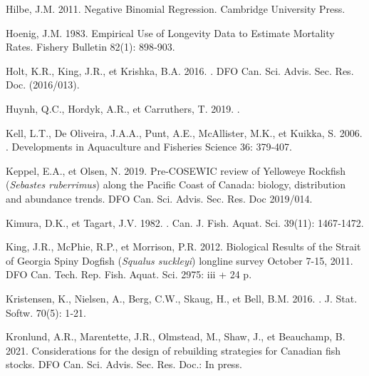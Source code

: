 \documentclass[french,11pt]{book}
\begin{document}
\begin{CSLReferences}{1}{0}
%
Hilbe, J.M. 2011. Negative {Binomial Regression}. {Cambridge University Press}.

%
Hoenig, J.M. 1983. Empirical Use of Longevity Data to Estimate Mortality Rates. Fishery Bulletin 82(1): 898‑903.

%
Holt, K.R., King, J.R., et Krishka, B.A. 2016. . DFO Can. Sci. Advis. Sec. Res. Doc. (2016/013).

%
Huynh, Q.C., Hordyk, A.R., et Carruthers, T. 2019. .

%
Kell, L.T., De Oliveira, J.A.A., Punt, A.E., McAllister, M.K., et Kuikka, S. 2006. . Developments in Aquaculture and Fisheries Science 36: 379‑407.

%
Keppel, E.A., et Olsen, N. 2019. {Pre-COSEWIC} review of {Yelloweye Rockfish} ({\emph{Sebastes ruberrimus}}) along the {Pacific} Coast of {Canada}: biology, distribution and abundance trends. DFO Can. Sci. Advis. Sec. Res. Doc 2019/014.

%
Kimura, D.K., et Tagart, J.V. 1982. . Can. J. Fish. Aquat. Sci. 39(11): 1467‑1472.

%
King, J.R., McPhie, R.P., et Morrison, P.R. 2012. Biological Results of the {Strait} of {Georgia Spiny Dogfish} ({\emph{Squalus suckleyi}}) longline survey {October} 7-15, 2011. DFO Can. Tech. Rep. Fish. Aquat. Sci. 2975: iii + 24 p.

%
Kristensen, K., Nielsen, A., Berg, C.W., Skaug, H., et Bell, B.M. 2016. . J. Stat. Softw. 70(5): 1‑21.

%
Kronlund, A.R., Marentette, J.R., Olmstead, M., Shaw, J., et Beauchamp, B. 2021. Considerations for the design of rebuilding strategies for {Canadian} fish stocks. DFO Can. Sci. Advis. Sec. Res. Doc.: In press.


\end{CSLReferences}
\end{document}
